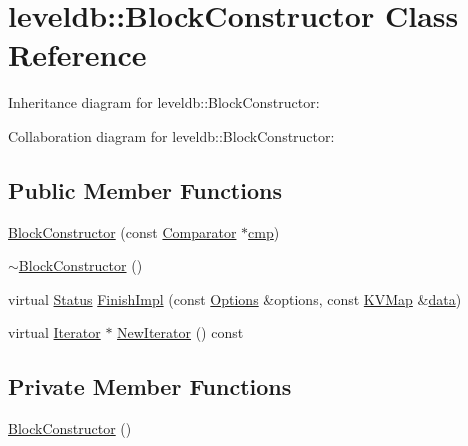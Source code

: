 \hypertarget{classleveldb_1_1_block_constructor}{\section{leveldb\-:\-:Block\-Constructor Class Reference}
\label{classleveldb_1_1_block_constructor}
}


Inheritance diagram for leveldb\-:\-:Block\-Constructor\-:


Collaboration diagram for leveldb\-:\-:Block\-Constructor\-:
\subsection*{Public Member Functions}
\begin{DoxyCompactItemize}
\item 
\hyperlink{classleveldb_1_1_block_constructor_a1f89523b9e688d6525da80d5595bee4c}{Block\-Constructor} (const \hyperlink{structleveldb_1_1_comparator}{Comparator} $\ast$\hyperlink{table__test_8cc_a87863e435922f0910ca8db43f02a6c0b}{cmp})
\item 
\hyperlink{classleveldb_1_1_block_constructor_a3eb2422f0a8eebe30c95c9e1f8b04ac9}{$\sim$\-Block\-Constructor} ()
\item 
virtual \hyperlink{classleveldb_1_1_status}{Status} \hyperlink{classleveldb_1_1_block_constructor_ae3f38f0769d34cb7d80776b8249f48ae}{Finish\-Impl} (const \hyperlink{structleveldb_1_1_options}{Options} \&options, const \hyperlink{namespaceleveldb_aac1e50450147be263e08252c6700f7a7}{K\-V\-Map} \&\hyperlink{classleveldb_1_1_constructor_a55a0363200d6e86d8beb3b15b75e3824}{data})
\item 
virtual \hyperlink{classleveldb_1_1_iterator}{Iterator} $\ast$ \hyperlink{classleveldb_1_1_block_constructor_a94b568e7f3aa7ad26eda141c3b4297ca}{New\-Iterator} () const 
\end{DoxyCompactItemize}
\subsection*{Private Member Functions}
\begin{DoxyCompactItemize}
\item 
\hyperlink{classleveldb_1_1_block_constructor_a4bc6a92e47ee2ec35ab4147940eb1564}{Block\-Constructor} ()
\end{DoxyCompactItemize}
